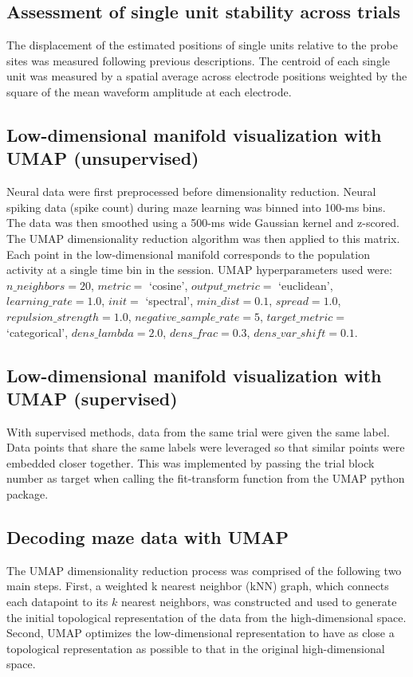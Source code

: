 \subsection{Assessment of single unit stability across trials}

The displacement of the estimated positions of single units relative to the probe sites was measured following previous descriptions. The centroid of each single unit was measured by a spatial average across electrode positions weighted by the square of the mean waveform amplitude at each electrode.

\subsection{Low-dimensional manifold visualization with UMAP (unsupervised)}

Neural data were first preprocessed before dimensionality reduction. Neural spiking data (spike count) during maze learning was binned into 100-ms bins. The data was then smoothed using a 500-ms wide Gaussian kernel and z-scored. The UMAP dimensionality reduction algorithm was then applied to this matrix. Each point in the low-dimensional manifold corresponds to the population activity at a single time bin in the session. UMAP hyperparameters used were: $n\_neighbors = 20$, $metric =$ `cosine', $output\_metric =$ `euclidean', $learning\_rate = 1.0$, $init =$ `spectral', $min\_dist = 0.1$, $spread = 1.0$, $repulsion\_strength = 1.0$, $negative\_sample\_rate = 5$, $target\_metric =$ `categorical', $dens\_lambda = 2.0$, $dens\_frac = 0.3$, $dens\_var\_shift = 0.1$.

\subsection{Low-dimensional manifold visualization with UMAP (supervised)}

With supervised methods, data from the same trial were given the same label. Data points that share the same labels were leveraged so that similar points were embedded closer together. This was implemented by passing the trial block number as target when calling the fit-transform function from the UMAP python package.

\subsection{Decoding maze data with UMAP}

The UMAP dimensionality reduction process was comprised of the following two main steps. First, a weighted k nearest neighbor (kNN) graph, which connects each datapoint to its $k$ nearest neighbors, was constructed and used to generate the initial topological representation of the data from the high-dimensional space. Second, UMAP optimizes the low-dimensional representation to have as close a topological representation as possible to that in the original high-dimensional space.

